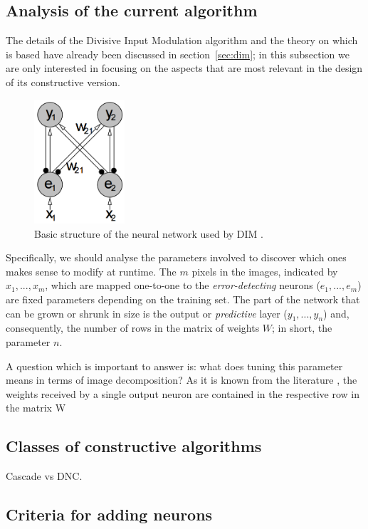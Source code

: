 \documentclass[11pt,a4paper]{report}
\begin{document}
			\subsection{Analysis of the current algorithm}
				The details of the Divisive Input Modulation algorithm and the theory on which is based have already been discussed in section~\ref{sec:dim}; in this subsection we are only interested in focusing on the aspects that are most relevant in the design of its constructive version.

				\begin{figure}[h]
					\centering
					\includegraphics[width=0.3\textwidth]{basictopology}
					\caption{Basic structure of the neural network used by DIM \cite{spratling2009unsupervised}.}
					\label{fig:dim}
				\end{figure}

				Specifically, we should analyse the parameters involved to discover which ones makes sense to modify at runtime. The $m$ pixels in the images, indicated by $x_1, ..., x_m$, which are mapped one-to-one to the \emph{error-detecting} neurons ($e_1, ..., e_m$) are fixed parameters depending on the training set. The part of the network that can be grown or shrunk in size is the output or \emph{predictive} layer ($y_1, ..., y_n$) and, consequently, the number of rows in the matrix of weights $W$; in short, the parameter $n$.
				
				A question which is important to answer is: what does tuning this parameter means in terms of image decomposition? As it is known from the literature \cite{spratling2014predictive}, the weights received by a single output neuron are contained in the respective row in the matrix W
				
			\subsection{Classes of constructive algorithms}
				Cascade vs DNC.
			\subsection{Criteria for adding neurons}
\end{document}

